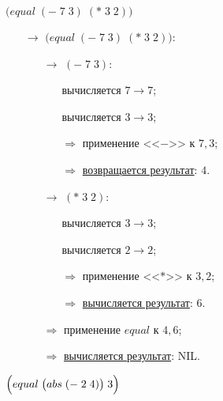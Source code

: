 \problem $\bigl(equal\; (-\; 7\; 3)\; (*\; 3\; 2) \bigr)$

\begin{itemize}
	\item[$\longrightarrow$] $\bigl(equal\; (-\; 7\; 3)\; (*\; 3\; 2) \bigr)$:
	\begin{itemize}
		\item[$\longrightarrow$] $(-\; 7\; 3)$:
		\begin{itemize}
			\item[\textbullet] вычисляется $7 \to 7$;
			\item[\textbullet] вычисляется $3 \to 3$;
			\item[$\Longrightarrow$] применение <<$-$>> к $7, 3$;
			\item[$\Longrightarrow$] \underline{возвращается результат}: $4$.
		\end{itemize}
		\item[$\longrightarrow$] $(*\; 3\; 2)$:
		\begin{itemize}
			\item[\textbullet] вычисляется $3 \to 3$;
			\item[\textbullet] вычисляется $2 \to 2$;
			\item[$\Longrightarrow$] применение <<$*$>> к $3, 2$;
			\item[$\Longrightarrow$] \underline{вычисляется результат}: $6$.
		\end{itemize}
		\item[$\Longrightarrow$] применение $equal$ к $4, 6$;
		\item[$\Longrightarrow$] \underline{вычисляется результат}: NIL.
	\end{itemize}
\end{itemize}


\problem $\Bigl(equal\; \bigl(abs\; (-\; 2\; 4)\bigr)\; 3\Bigr)$

